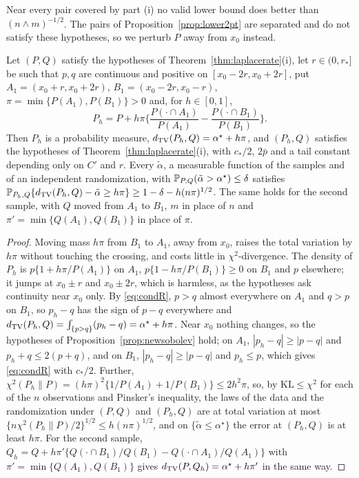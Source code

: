 Near every pair covered by part (i) no valid lower bound does better than $(n\wedge m)^{-1/2}$. The pairs of Proposition~\ref{prop:lower2pt} are separated
and do not satisfy these hypotheses, so we perturb $P$ away from $x_0$ instead.

\begin{lemma}
\label{lem:laplocal}
Let $(P,Q)$ satisfy the hypotheses of Theorem~\ref{thm:laplacerate}(i), let $r\in(0,r_\ast]$ be such that $p,q$ are continuous
and positive on $[x_0-2r,x_0+2r]$, put $A_1=(x_0+r,x_0+2r)$, $B_1=(x_0-2r,x_0-r)$, $\pi=\min\{P(A_1),P(B_1)\}>0$ and, for
$h\in[0,1]$,
\[
P_h=P+h\pi\Big\{\frac{P(\cdot\cap A_1)}{P(A_1)}-\frac{P(\cdot\cap B_1)}{P(B_1)}\Big\}.
\]
Then $P_h$ is a probability measure, $d_{\mathrm{TV}}(P_h,Q)=\alpha^\star+h\pi$, and $(P_h,Q)$ satisfies the hypotheses of
Theorem~\ref{thm:laplacerate}(i), with $c_\ast/2$, $2\bar p$ and a tail constant depending only on $C'$ and $r$. Every
$\tilde\alpha$, a measurable function of the samples and of an independent randomization, with
$\mathbb{P}_{P,Q}(\tilde\alpha>\alpha^\star)\le\delta$ satisfies
$\mathbb{P}_{P_h,Q}\{d_{\mathrm{TV}}(P_h,Q)-\tilde\alpha\ge h\pi\}\ge1-\delta-h(n\pi)^{1/2}$. The same holds for the second sample, with $Q$
moved from $A_1$ to $B_1$, $m$ in place of $n$ and $\pi'=\min\{Q(A_1),Q(B_1)\}$ in place of $\pi$.
\end{lemma}

\begin{proof}
Moving mass $h\pi$ from $B_1$ to $A_1$, away from $x_0$, raises the total variation by $h\pi$ without touching the
crossing, and costs little in $\chi^2$-divergence. The density of $P_h$ is $p\{1+h\pi/P(A_1)\}$ on $A_1$, $p\{1-h\pi/P(B_1)\}\ge0$ on $B_1$ and $p$ elsewhere; it jumps
at $x_0\pm r$ and $x_0\pm2r$, which is harmless, as the hypotheses ask continuity near $x_0$ only. By
\eqref{eq:condR}, $p>q$ almost everywhere on $A_1$ and $q>p$ on $B_1$, so $p_h-q$ has the sign of $p-q$ everywhere and
$d_{\mathrm{TV}}(P_h,Q)=\int_{\{p>q\}}(p_h-q)=\alpha^\star+h\pi$. Near $x_0$ nothing changes, so the hypotheses of
Proposition~\ref{prop:newsobolev} hold; on $A_1$, $|p_h-q|\ge|p-q|$ and $p_h+q\le2(p+q)$, and on $B_1$, $|p_h-q|\ge|p-q|$ and
$p_h\le p$, which gives \eqref{eq:condR} with $c_\ast/2$. Further, $\chi^2(P_h\|P)=(h\pi)^2\{1/P(A_1)+1/P(B_1)\}\le2h^2\pi$, so,
by $\mathrm{KL}\le\chi^2$ for each of the $n$ observations and Pinsker's inequality, the laws of the data and the randomization under $(P,Q)$ and
$(P_h,Q)$ are at total variation at most $\{n\chi^2(P_h\|P)/2\}^{1/2}\le h(n\pi)^{1/2}$, and on $\{\tilde\alpha\le\alpha^\star\}$ the
error at $(P_h,Q)$ is at least $h\pi$. For the second sample, $Q_h=Q+h\pi'\{Q(\cdot\cap B_1)/Q(B_1)-Q(\cdot\cap A_1)/Q(A_1)\}$
with $\pi'=\min\{Q(A_1),Q(B_1)\}$ gives $d_{\mathrm{TV}}(P,Q_h)=\alpha^\star+h\pi'$ in the same way.
\end{proof}

